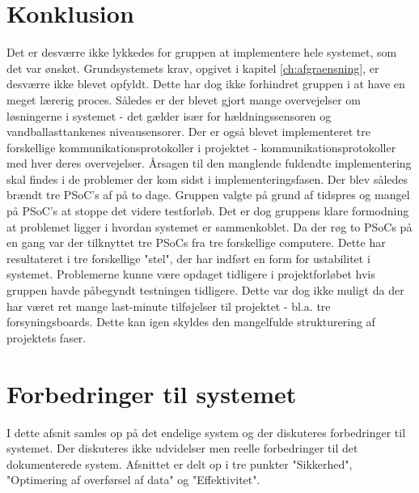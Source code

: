 \chapter{Konklusion}


Det er desværre ikke lykkedes for gruppen at implementere hele systemet, som det var ønsket. Grundsystemets krav, opgivet i kapitel \ref{ch:afgraensning}, er desværre ikke blevet opfyldt. Dette har dog ikke forhindret gruppen i at have en meget lærerig proces. Således er der blevet gjort mange overvejelser om løsningerne i systemet - det gælder især for hældningssensoren og vandballasttankenes niveausensorer.
Der er også blevet implementeret tre forskellige kommunikationsprotokoller i projektet - kommunikationsprotokoller med hver deres overvejelser. Årsagen til den manglende fuldendte implementering skal findes i de problemer der kom sidst i implementeringsfasen. Der blev således brændt tre PSoC's af på to dage. Gruppen valgte på grund af tidspres og mangel på PSoC's at stoppe det videre testforløb. Det er dog gruppens klare formodning at problemet ligger i hvordan systemet er sammenkoblet. Da der røg to PSoCs på en gang var der tilknyttet tre PSoCs fra tre forskellige computere. Dette har resultateret i tre forskellige "stel", der har indført en form for ustabilitet i systemet.
Problemerne kunne være opdaget tidligere i projektforløbet hvis gruppen havde påbegyndt testningen tidligere. Dette var dog ikke muligt da der har været ret mange last-minute tilføjelser til projektet - bl.a. tre forsyningsboards. Dette kan igen skyldes den mangelfulde strukturering af projektets faser.

\chapter{Forbedringer til systemet}

I dette afsnit samles op på det endelige system og der diskuteres forbedringer til systemet. Der diskuteres ikke udvidelser men reelle forbedringer til det dokumenterede system. Afsnittet er delt op i tre punkter "Sikkerhed", "Optimering af overførsel af data" og "Effektivitet".

